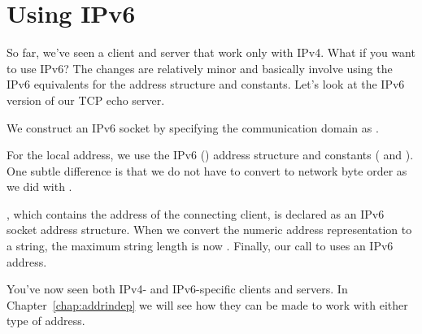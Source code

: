 \section{Using IPv6}

So far, we've seen a client and server that work only with IPv4.
What if you want to use IPv6? 
The changes are relatively minor and basically involve using the IPv6
equivalents for the address structure and constants.  Let's look at the IPv6
version of our TCP echo server.


\begin{topcode}


We construct an IPv6 socket by specifying the communication domain as
.


For the local address, we use the IPv6 () address structure and constants ( and
).  One subtle difference is that we do
not have to convert  to network byte order as we did
with .


, which contains the address of the connecting client,
is declared as an IPv6 socket address structure.
When we convert the numeric address representation
to a string, the maximum string length is now .
Finally, our call to  uses an IPv6 address.

\end{topcode}

You've now seen both IPv4- and IPv6-specific clients and servers.
In Chapter~\ref{chap:addrindep} we will see how they can be made to work with
either type of address.

